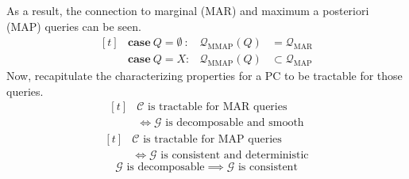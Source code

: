 \documentclass[9pt,fleqn,twoside,twocolumn]{stdglobal}
\DeclareMathOperator*{\argmax}{arg\ max}
\DeclareMathOperator{\val}{val}
\begin{document}
  \noindent
  As a result, the connection to marginal (MAR) and maximum a posteriori (MAP) queries can be seen.
  \[
    \begin{aligned}[t]
      &\mathbf{case}\ Q=\emptyset\ : &\mathscr{Q}_\mathrm{MMAP}(Q) &= \mathscr{Q}_\mathrm{MAR} \\
      &\mathbf{case}\ Q=X: &\mathscr{Q}_\mathrm{MMAP}(Q) &\subset \mathscr{Q}_\mathrm{MAP}
    \end{aligned}
  \]
  Now, recapitulate the characterizing properties for a PC to be tractable for those queries.
  \[
    \begin{aligned}[t]
      &\text{$\mathscr{C}$ is tractable for MAR queries} \\
      &\iff \text{$\mathscr{G}$ is decomposable and smooth}
    \end{aligned}
  \]
  \[
    \begin{aligned}[t]
      &\text{$\mathscr{C}$ is tractable for MAP queries} \\
      &\iff \text{$\mathscr{G}$ is consistent and deterministic}
    \end{aligned}
  \]
  \[
    \text{$\mathscr{G}$ is decomposable} \implies \text{$\mathscr{G}$ is consistent}
  \]



\end{document}
